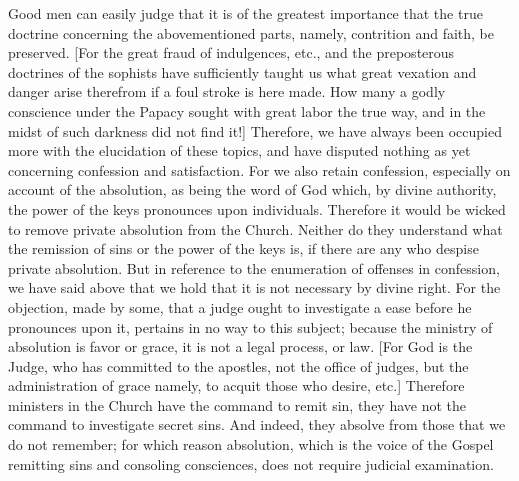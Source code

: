 Good men can easily judge that it is of the greatest importance that
the true doctrine concerning the abovementioned parts, namely,
contrition and faith, be preserved.  [For the great fraud of
indulgences, etc., and the preposterous doctrines of the sophists
have sufficiently taught us what great vexation and danger arise
therefrom if a foul stroke is here made.  How many a godly conscience
under the Papacy sought with great labor the true way, and in the
midst of such darkness did not find it!] Therefore, we have always
been occupied more with the elucidation of these topics, and have
disputed nothing as yet concerning confession and satisfaction.  For
we also retain confession, especially on account of the absolution,
as being the word of God which, by divine authority, the power of the
keys pronounces upon individuals.  Therefore it would be wicked to
remove private absolution from the Church.  Neither do they
understand what the remission of sins or the power of the keys is, if
there are any who despise private absolution.  But in reference to
the enumeration of offenses in confession, we have said above that we
hold that it is not necessary by divine right.  For the objection,
made by some, that a judge ought to investigate a ease before he
pronounces upon it, pertains in no way to this subject; because the
ministry of absolution is favor or grace, it is not a legal process,
or law.  [For God is the Judge, who has committed to the apostles,
not the office of judges, but the administration of grace namely, to
acquit those who desire, etc.] Therefore ministers in the Church have
the command to remit sin, they have not the command to investigate
secret sins.  And indeed, they absolve from those that we do not
remember; for which reason absolution, which is the voice of the
Gospel remitting sins and consoling consciences, does not require
judicial examination.

